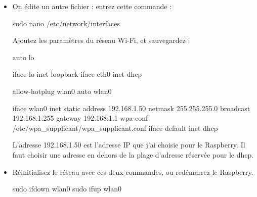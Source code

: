 \documentclass[12pt,a4paper]{report}
\begin{document}
\begin{itemize}
\item On édite un autre fichier : entrez cette commande : 

\bigbreak
\begin{verbatimtab}[3]
sudo nano /etc/network/interfaces
\end{verbatimtab}
\bigbreak

Ajoutez les paramètres du réseau Wi-Fi, et sauvegardez :

\bigbreak
\begin{verbatimtab}[3]
auto lo

iface lo inet loopback
iface eth0 inet dhcp

allow-hotplug wlan0
auto wlan0

iface wlan0 inet static
address 192.168.1.50
netmask 255.255.255.0
broadcast 192.168.1.255
gateway 192.168.1.1
wpa-conf /etc/wpa_supplicant/wpa_supplicant.conf
iface default inet dhcp
\end{verbatimtab}
\bigbreak

L'adresse 192.168.1.50 est l'adresse IP que j'ai choisie pour le Raspberry. Il faut choisir une adresse en dehors de la plage d'adresse réservée pour le dhcp.

\item Réinitialisez le réseau avec ces deux commandes, ou redémarrez le Raspberry.

\bigbreak
\begin{verbatimtab}[3]
sudo ifdown wlan0
sudo ifup wlan0
\end{verbatimtab}
\bigbreak
\end{itemize}
\end{document}
